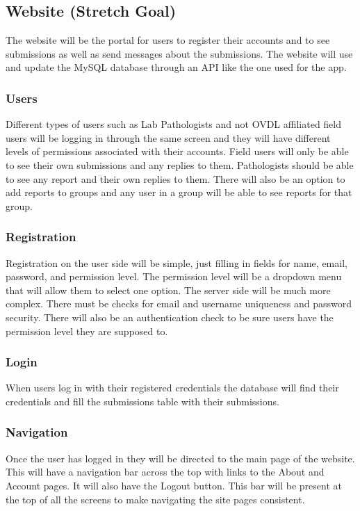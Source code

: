 \documentclass[onecolumn, draftclsnofoot,10pt, compsoc]{IEEEtran}
\begin{document}
\subsection{Website (Stretch Goal)}
The website will be the portal for users to register their accounts and to see submissions as well as send messages about the submissions. The website will use and update the MySQL database through an API like the one used for the app. 

\subsubsection{Users}
Different types of users such as Lab Pathologists and not OVDL affiliated field users will be logging in through the same screen and they will have different levels of permissions associated with their accounts. Field users will only be able to see their own submissions and any replies to them. Pathologists should be able to see any report and their own replies to them. There will also be an option to add reports to groups and any user in a group will be able to see reports for that group. 

\subsubsection{Registration}
Registration on the user side will be simple, just filling in fields for name, email, password, and permission level. The permission level will be a dropdown menu that will allow them to select one option. The server side will be much more complex. There must be checks for email and username uniqueness and password security. There will also be an authentication check to be sure users have the permission level they are supposed to. 

\subsubsection{Login}
When users log in with their registered credentials the database will find their credentials and fill the submissions table with their submissions. 

\subsubsection{Navigation}
Once the user has logged in they will be directed to the main page of the website. This will have a navigation bar across the top with links to the About and Account pages. It will also have the Logout button. This bar will be present at the top of all the screens to make navigating the site pages consistent. 
\end{document}
